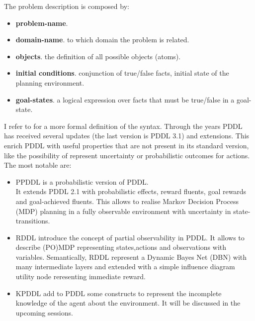 \documentclass[pdftex,12pt,a4paper]{report}
\begin{document}
The problem description is composed by:
\begin{itemize}
\item \textbf{problem-name}.
\item \textbf{domain-name}. to which domain the problem is related.
\item \textbf{objects}. the definition of all possible objects (atoms).
\item \textbf{initial conditions}. conjunction of true/false facts, initial state of the planning environment.
\item \textbf{goal-states}. a logical expression over facts that must be true/false in a goal-state.
\end{itemize}
\noindent I refer to \cite{mcdermott1998pddl}%
for a more formal definition of the syntax.
\noindent Through the years PDDL has received several updates (the last version is PDDL 3.1) and extensions. This enrich PDDL with useful properties that are not present in its standard version, like the possibility of represent uncertainty or probabilistic outcomes for actions.
The most notable are:
\begin{itemize}
\item PPDDL\cite{younes2004ppddl1}%
is a probabilistic version of PDDL. 
\\\noindent It extends PDDL 2.1 with probabilistic effects, reward fluents, goal rewards and goal-achieved fluents. This allows to realise Markov Decision Process (MDP) planning in a fully observable environment with uncertainty in state-transitions.
\item RDDL\cite{sanner2010relational}%
introduce the concept of partial observability in PDDL. It allows to describe (PO)MDP representing states,actions and observations with variables. Semantically, RDDL represent a Dynamic Bayes Net (DBN) with many intermediate layers and extended with a simple influence diagram utility node reresenting immediate reward.
\item KPDDL\cite{iocchi2003}%
add to PDDL some constructs to represent the incomplete knowledge of the agent about the environment. It will be discussed in the upcoming sessions.
\end{itemize}
\end{document}
